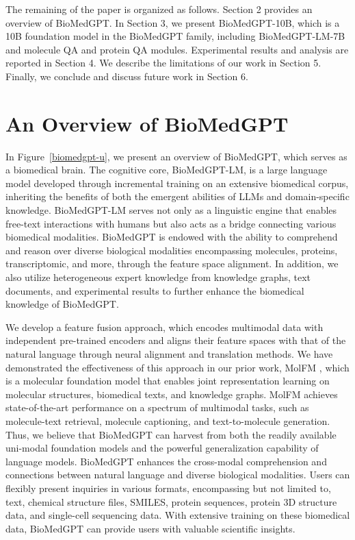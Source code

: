 \documentclass{article}
\begin{document}
The remaining of the paper is organized as follows. Section 2 provides an overview of BioMedGPT. In Section 3, we present BioMedGPT-10B, which is a 10B foundation model in the BioMedGPT family, including BioMedGPT-LM-7B and molecule QA and protein QA modules. Experimental results and analysis are reported in Section 4. We describe the limitations of our work in Section 5. Finally, we conclude and discuss future work in Section 6.


\section{An Overview of BioMedGPT}






In Figure~\ref{biomedgpt-u}, we present an overview of BioMedGPT, which serves as a biomedical brain. The cognitive core, BioMedGPT-LM, is a large language model developed through incremental training on an extensive biomedical corpus, inheriting the benefits of both the emergent abilities of LLMs and domain-specific knowledge. BioMedGPT-LM serves not only as a linguistic engine that enables free-text interactions with humans but also acts as a bridge connecting various biomedical modalities. BioMedGPT is endowed with the ability to comprehend and reason over diverse biological modalities encompassing molecules, proteins, transcriptomic, and more, through the feature space alignment. In addition, we also utilize heterogeneous expert knowledge from knowledge graphs, text documents, and experimental results to further enhance the biomedical knowledge of BioMedGPT.





We develop a feature fusion approach, which encodes multimodal data with independent pre-trained encoders and aligns their feature spaces with that of the natural language through neural alignment and translation methods. We have demonstrated the effectiveness of this approach in our prior work, MolFM \citep{molfm}, which is a molecular foundation model that enables joint representation learning on molecular structures, biomedical texts, and knowledge graphs. MolFM achieves state-of-the-art performance on a spectrum of multimodal tasks, such as molecule-text retrieval, molecule captioning, and text-to-molecule generation. Thus, we believe that BioMedGPT can harvest from both the readily available uni-modal foundation models and the powerful generalization capability of language models. BioMedGPT enhances the cross-modal comprehension and connections between natural language and diverse biological modalities. Users can flexibly present inquiries in various formats, encompassing but not limited to, text, chemical structure files, SMILES, protein sequences, protein 3D structure data, and single-cell sequencing data. With extensive training on these biomedical data, BioMedGPT can provide users with valuable scientific insights. 
\end{document}
